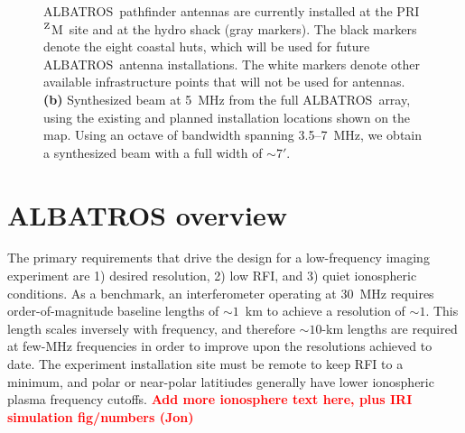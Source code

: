 \documentclass{ws-jai}
\def\albatros{ALBATROS}
\def\prizm{PRI$^{\rm Z}$M}
\newcommand{\attention}[1]{\textcolor{red}{\bf {#1}}}
\begin{document}
\begin{figure}
{      \albatros\ pathfinder antennas are currently installed at the
      \prizm\ site and at the hydro shack (gray markers).  The black
      markers denote the eight coastal huts, which will be used for
      future \albatros\ antenna installations.  The white markers
      denote other available infrastructure points that will not be
      used for antennas.  {\bf (b)} Synthesized beam at 5~MHz from the
      full \albatros\ array, using the existing and planned
      installation locations shown on the map.  Using an octave of
      bandwidth spanning 3.5--7~MHz, we obtain a synthesized beam with
      a full width of $\sim7'$.}\label{Fig:marion_map_beam}
\end{figure}

\section{ALBATROS overview}



The primary requirements that drive the design for a low-frequency
imaging experiment are 1) desired resolution, 2) low RFI, and 3) quiet
ionospheric conditions.  As a benchmark, an interferometer operating
at 30~MHz requires order-of-magnitude baseline lengths of $\sim 1$~km
to achieve a resolution of $\sim 1$\degree.  This length scales
inversely with frequency, and therefore $\sim 10$-km lengths are
required at few-MHz frequencies in order to improve upon the
resolutions achieved to date.  The experiment installation site must
be remote to keep RFI to a minimum, and polar or near-polar latitiudes
generally have lower ionospheric plasma frequency cutoffs.
\attention{Add more ionosphere text here, plus IRI simulation
  fig/numbers (Jon)}
\end{document}
